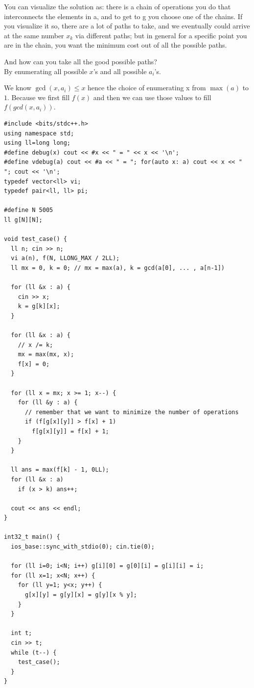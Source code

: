You can visualize the solution as: there is a chain of operations you do that interconnects the elements in a, and to get to g you choose one of the chains.
If you visualize it so, there are a lot of paths to take, and we eventually could arrive at the same number \( x_k \) via different paths; but in general for a specific point you are in the chain, you want the minimum cost out of all the possible paths.

And how can you take all the good possible paths? \\
By enumerating all possible \( x \)'s and all possible \( a_i \)'s.

\begin{obs}
    We know $\gcd(x, a_i) \leq x$ hence the choice of enumerating x from $\max(a)$ to $1$. Because we first fill $f(x)$ and then we can use those values to fill $f(gcd(x, a_i))$.
\end{obs}


\begin{verbatim}
#include <bits/stdc++.h>
using namespace std;
using ll=long long;
#define debug(x) cout << #x << " = " << x << '\n';
#define vdebug(a) cout << #a << " = "; for(auto x: a) cout << x << " "; cout << '\n';
typedef vector<ll> vi;
typedef pair<ll, ll> pi;

#define N 5005
ll g[N][N];

void test_case() {
  ll n; cin >> n;
  vi a(n), f(N, LLONG_MAX / 2LL);
  ll mx = 0, k = 0; // mx = max(a), k = gcd(a[0], ... , a[n-1])

  for (ll &x : a) {
    cin >> x;
    k = g[k][x];
  }
  
  for (ll &x : a) {
    // x /= k;
    mx = max(mx, x);
    f[x] = 0;
  } 
  
  for (ll x = mx; x >= 1; x--) {
    for (ll &y : a) {
      // remember that we want to minimize the number of operations
      if (f[g[x][y]] > f[x] + 1)
        f[g[x][y]] = f[x] + 1;
    }
  }
  
  ll ans = max(f[k] - 1, 0LL);
  for (ll &x : a) 
    if (x > k) ans++;

  cout << ans << endl;
}

int32_t main() {
  ios_base::sync_with_stdio(0); cin.tie(0);

  for (ll i=0; i<N; i++) g[i][0] = g[0][i] = g[i][i] = i;
  for (ll x=1; x<N; x++) {
    for (ll y=1; y<x; y++) {
      g[x][y] = g[y][x] = g[y][x % y];
    }
  }

  int t;
  cin >> t;
  while (t--) {
    test_case();    
  }
}
\end{verbatim}


